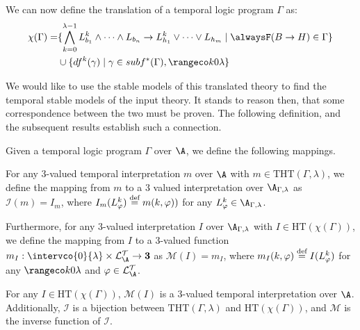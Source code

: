 We can now define the translation of a temporal logic program $\Gamma$
as:
\begin{align*}
  \chi(\Gamma)  = &\{ \bigwedge_{k=0}^{\lambda-1} L_{b_1}^k \land \dots \land L_{b_n}
                    \rightarrow L_{h_1}^k \lor \dots \lor L_{h_m} \mid \tempruleshort \in \Gamma \} \\
                  & \cup \{ df^k(\gamma) \mid \gamma \in subf^*(\Gamma), \kinlambda \}
\end{align*}

We would like to use the stable models of this translated theory to
find the temporal stable models of the input theory. It stands to
reason then, that some correspondence between the two must be
proven. The following definition, and the subsequent results establish
such a connection.
\begin{definition}
  Given a temporal logic program $\Gamma$ over $\A$, we define the
  following mappings.  

  For any 3-valued temporal interpretation $m$
  over $\A$ with $m \in \text{THT}(\Gamma,\lambda)$, we define the
  mapping from $m$ to a 3 valued interpretation over
  $\A_{\Gamma,\lambda}$ as $\mathcal{I}(m) = I_m$, where
  $I_m(L^k_\varphi) \stackrel{\text{def}}{=} m(k,\varphi))$ for any
  $L^k_\varphi \in \A_{\Gamma,\lambda}$.

  Furthermore, for any 3-valued interpretation $I$ over
  $\A_{\Gamma,\lambda}$ with $I \in \text{HT}(\chi(\Gamma))$, we
  define the mapping from $I$ to a 3-valued function
  $m_I: \intervco{0}{\lambda} \times \langat \rightarrow
  \textbf{3}$ as $\mathcal{M}(I) = m_I$, where
  $m_I(k,\varphi) \stackrel{\text{def}}{=} I(L_{\varphi}^k)$ for any $\kinlambda$ and
  $\varphi \in \langat$.
\end{definition}

\begin{theorem}\label{theorem:translation}

  For any $I \in \text{HT}(\chi(\Gamma))$, $\mathcal{M}(I)$ is a
  3-valued temporal interpretation over $\A$. Additionally,
  $\mathcal{I}$ is a bijection between $\text{THT}(\Gamma,\lambda)$
  and $\text{HT}(\chi(\Gamma))$, and $\mathcal{M}$ is the inverse
  function of $\mathcal{I}$.
\end{theorem}


